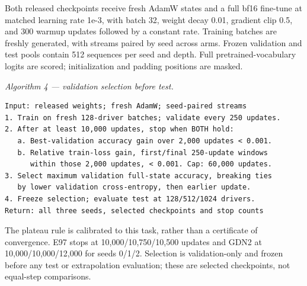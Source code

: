 \documentclass[10pt]{article}
\theoremstyle{canonical}
\theoremstyle{canonicalbullet}
\begin{document}
Both released checkpoints receive fresh AdamW states and a full bf16 fine-tune at matched learning rate 1e-3, with batch 32, weight decay 0.01, gradient clip 0.5, and 300 warmup updates followed by a constant rate. Training batches are freshly generated, with streams paired by seed across arms. Frozen validation and test pools contain 512 sequences per seed and depth. Full pretrained-vocabulary logits are scored; initialization and padding positions are masked.

\emph{Algorithm 4 --- validation selection before test.}
\begin{verbatim}
Input: released weights; fresh AdamW; seed-paired streams
1. Train on fresh 128-driver batches; validate every 250 updates.
2. After at least 10,000 updates, stop when BOTH hold:
   a. Best-validation accuracy gain over 2,000 updates < 0.001.
   b. Relative train-loss gain, first/final 250-update windows
      within those 2,000 updates, < 0.001. Cap: 60,000 updates.
3. Select maximum validation full-state accuracy, breaking ties
   by lower validation cross-entropy, then earlier update.
4. Freeze selection; evaluate test at 128/512/1024 drivers.
Return: all three seeds, selected checkpoints and stop counts
\end{verbatim}


The plateau rule is calibrated to this task, rather than a certificate of convergence. E97 stops at 10,000/10,750/10,500 updates and GDN2 at 10,000/10,000/12,000 for seeds 0/1/2. Selection is validation-only and frozen before any test or extrapolation evaluation; these are selected checkpoints, not equal-step comparisons.
\end{document}
